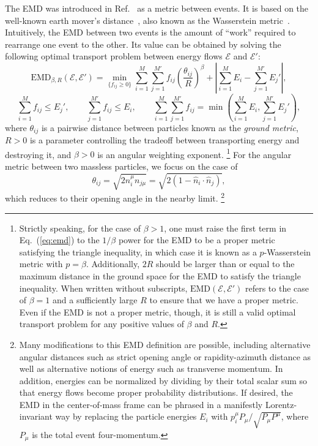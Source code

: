 \documentclass[letterpaper,11pt]{article}
\newcommand{\E}{\mathcal{E}}
\DeclareRobustCommand{\Eq}[1]{Eq.~(\ref{#1})}
\DeclareRobustCommand{\Ref}[1]{Ref.~\cite{#1}}
\newcommand{\EMD}{\text{EMD}\xspace}
\begin{document}
The EMD was introduced in \Ref{Komiske:2019fks} as a metric between events.
%
It is based on the well-known earth mover's distance~\cite{DBLP:journals/pami/PelegWR89,Rubner:1998:MDA:938978.939133,Rubner:2000:EMD:365875.365881,DBLP:conf/eccv/PeleW08,DBLP:conf/gsi/PeleT13}, also known as the Wasserstein metric~\cite{wasserstein1969markov,dobrushin1970prescribing}.
%
Intuitively, the EMD between two events is the amount of ``work'' required to rearrange one event to the other.
%
Its value can be obtained by solving the following optimal transport problem between energy flows $\E$ and $\E'$:
%
\begin{equation}
\label{eq:emd}
\EMD_{\beta,R} (\mathcal E, \mathcal E') = \min_{\{f_{ij}\ge0\}} \sum_{i=1}^M\sum_{j=1}^{M'} f_{ij} \left( \frac{\theta_{ij}}{R} \right)^\beta + \left|\sum_{i=1}^M E_i - \sum_{j=1}^{M'}E_j'\right|,
\end{equation}
%
\begin{equation}
\label{eq:emdconstraints}
\sum_{i=1}^M f_{ij} \le E_j', \quad\quad \sum_{j=1}^{M'} f_{ij} \le E_i, \quad\quad \sum_{i=1}^M\sum_{j=1}^{M'} f_{ij} = \min\left(\sum_{i=1}^M E_i,\sum_{j=1}^{M'}E_j'\right),
\end{equation}
%
where $\theta_{ij}$ is a pairwise distance between particles known as the \emph{ground metric}, $R>0$ is a parameter controlling the tradeoff between transporting energy and destroying it, and $\beta > 0$ is an angular weighting exponent.%
%
\footnote{\label{footnote:pWasser}
Strictly speaking, for the case of $\beta>1$, one must raise the first term in \Eq{eq:emd} to the $1/\beta$ power for the EMD to be a proper metric satisfying the triangle inequality, in which case it is known as a $p$-Wasserstein metric with $p = \beta$.
%
Additionally, $2R$ should be larger than or equal to the maximum distance in the ground space for the EMD to satisfy the triangle inequality.
%
When written without subscripts, $\EMD(\E,\E')$ refers to the case of $\beta=1$ and a sufficiently large $R$ to ensure that we have a proper metric.
%
Even if the EMD is not a proper metric, though, it is still a valid optimal transport problem for any positive values of $\beta$ and $R$.
}
%
For the angular metric between two massless particles, we focus on the case of
%
\begin{equation}
\label{eq:theta_def}
\theta_{ij} = \sqrt{2n_i^\mu n_{j\mu}} = \sqrt{2 (1 - \hat{n}_i \cdot \hat{n}_j)},
\end{equation}
%
which reduces to their opening angle in the nearby limit.%
%
\footnote{Many modifications to this EMD definition are possible, including alternative angular distances such as strict opening angle or rapidity-azimuth distance as well as alternative notions of energy such as transverse momentum. In addition, energies can be normalized by dividing by their total scalar sum so that energy flows become proper probability distributions.  If desired, the EMD in the center-of-mass frame can be phrased in a manifestly Lorentz-invariant way by replacing the particle energies $E_i$ with $p_i^\mu P_\mu/\sqrt{P_\mu P^\mu}$, where $P_\mu$ is the total event four-momentum.}
\end{document}
